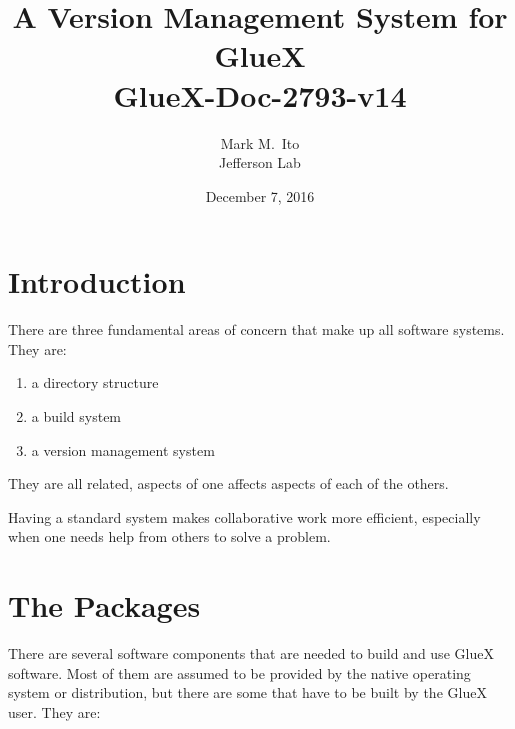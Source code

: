 \documentclass[12pt]{article}
\title{A Version Management System for GlueX \\ \medskip \large
  GlueX-Doc-2793-v14}
\author{Mark M.\ Ito \\ Jefferson Lab}
\date{December 7, 2016}
\begin{document}
\maketitle


\tableofcontents

\section{Introduction}
There are three fundamental areas of concern that make up all software
systems. They are:

\begin{enumerate}
\item a directory structure
\item a build system
\item a version management system
\end{enumerate}

They are all related, aspects of one affects aspects of each of the others.

Having a standard system makes collaborative work more efficient,
especially when one needs help from others to solve a problem.

\section{The Packages}

There are several software components that are needed to build and use
GlueX software. Most of them are assumed to be provided by the native
operating system or distribution, but there are some that have to be
built by the GlueX user. They are:
\end{document}
